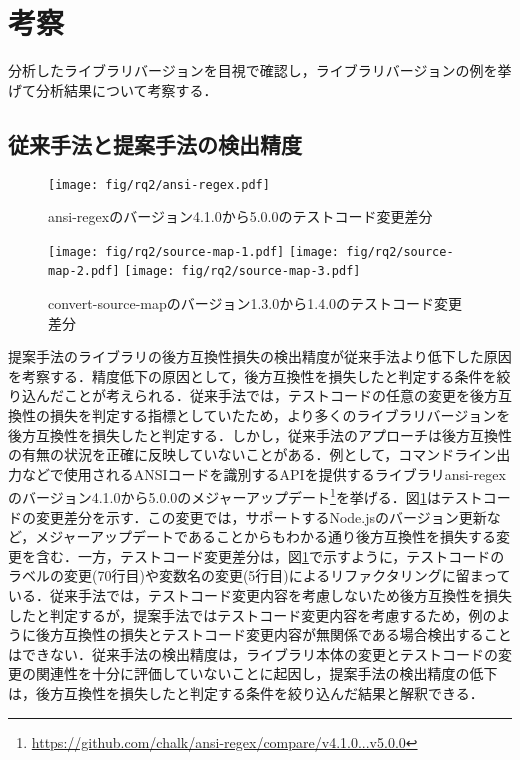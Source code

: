 \documentclass[submit]{ipsj}
\begin{document}
\section{考察}\label{rq2:kousatu}

分析したライブラリバージョンを目視で確認し，ライブラリバージョンの例を挙げて分析結果について考察する．

\subsection{従来手法と提案手法の検出精度}

\begin{figure}[t]
  \centering
  \texttt{[image: fig/rq2/ansi-regex.pdf]}
  \caption{ansi-regexのバージョン4.1.0から5.0.0のテストコード変更差分}
  \label{fig:rq2.ansi-regex}
\end{figure}

\begin{figure}[t]
  \centering
  \texttt{[image: fig/rq2/source-map-1.pdf]}
  \texttt{[image: fig/rq2/source-map-2.pdf]}
  \texttt{[image: fig/rq2/source-map-3.pdf]}
  \caption{convert-source-mapのバージョン1.3.0から1.4.0のテストコード変更差分}
  \label{fig:rq2.convert-source-map}
\end{figure}

提案手法のライブラリの後方互換性損失の検出精度が従来手法より低下した原因を考察する．精度低下の原因として，後方互換性を損失したと判定する条件を絞り込んだことが考えられる．従来手法では，テストコードの任意の変更を後方互換性の損失を判定する指標としていたため，より多くのライブラリバージョンを後方互換性を損失したと判定する．しかし，従来手法のアプローチは後方互換性の有無の状況を正確に反映していないことがある．例として，コマンドライン出力などで使用されるANSIコードを識別するAPIを提供するライブラリansi-regexのバージョン4.1.0から5.0.0のメジャーアップデート\footnote{\url{https://github.com/chalk/ansi-regex/compare/v4.1.0...v5.0.0}}を挙げる．図\ref{fig:rq2.ansi-regex}はテストコードの変更差分を示す．この変更では，サポートするNode.jsのバージョン更新など，メジャーアップデートであることからもわかる通り後方互換性を損失する変更を含む．一方，テストコード変更差分は，図\ref{fig:rq2.ansi-regex}で示すように，テストコードのラベルの変更(70行目)や変数名の変更(5行目)によるリファクタリングに留まっている．従来手法では，テストコード変更内容を考慮しないため後方互換性を損失したと判定するが，提案手法ではテストコード変更内容を考慮するため，例のように後方互換性の損失とテストコード変更内容が無関係である場合検出することはできない．従来手法の検出精度は，ライブラリ本体の変更とテストコードの変更の関連性を十分に評価していないことに起因し，提案手法の検出精度の低下は，後方互換性を損失したと判定する条件を絞り込んだ結果と解釈できる．
\end{document}

